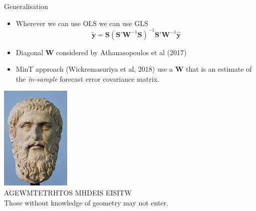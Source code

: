 \documentclass[handout]{beamer}
\begin{document}
\begin{frame}{Generalisation}
  \begin{itemize}  
  \item Wherever we can use OLS we can use GLS
  \begin{equation*}
  \tilde{\bm{y}}={\bm S}({\bm S}'{\bm W}^{-1}{\bm S})^{-1}{\bm S}'{\bm W}^{-1}{\hat{\bm{y}}}
  \end{equation*}
  \item Diagonal ${\bm W}$ considered by Athanasopoulos et al (2017)
  \item MinT approach (Wickremasuriya et al, 2018) use a ${\bm W}$ that is an estimate of the {\em in-sample} forecast error covariance matrix.
  \end{itemize}
\end{frame}
%
\begin{frame}
\centering
\includegraphics[height=5cm]{Figs/Plato.jpeg}\\
\textgreek{AGEWMTETRHTOS MHDEIS EISITW}\\
Those without knowledge of geometry may not enter.
\end{frame}
\end{document}
